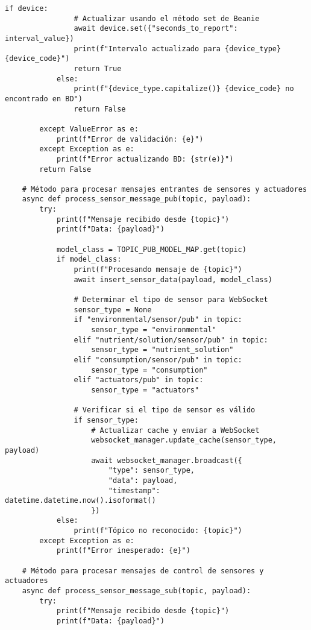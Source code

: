 \begin{lstlisting}[label=cod:mqtt_connection,caption=Definición de Clase para cliente MQTT., language=PythonUTF8]
            if device:
                # Actualizar usando el método set de Beanie
                await device.set({"seconds_to_report": interval_value})       
                print(f"Intervalo actualizado para {device_type} {device_code}")
                return True
            else:
                print(f"{device_type.capitalize()} {device_code} no encontrado en BD")
                return False
                
        except ValueError as e:
            print(f"Error de validación: {e}")
        except Exception as e:
            print(f"Error actualizando BD: {str(e)}")
        return False
            
    # Método para procesar mensajes entrantes de sensores y actuadores
    async def process_sensor_message_pub(topic, payload):
        try:
            print(f"Mensaje recibido desde {topic}")
            print(f"Data: {payload}")

            model_class = TOPIC_PUB_MODEL_MAP.get(topic)
            if model_class:
                print(f"Procesando mensaje de {topic}")
                await insert_sensor_data(payload, model_class)
                
                # Determinar el tipo de sensor para WebSocket
                sensor_type = None
                if "environmental/sensor/pub" in topic:
                    sensor_type = "environmental"
                elif "nutrient/solution/sensor/pub" in topic:
                    sensor_type = "nutrient_solution"
                elif "consumption/sensor/pub" in topic:
                    sensor_type = "consumption"
                elif "actuators/pub" in topic:
                    sensor_type = "actuators"
                
                # Verificar si el tipo de sensor es válido
                if sensor_type:
                    # Actualizar cache y enviar a WebSocket
                    websocket_manager.update_cache(sensor_type, payload)
                    await websocket_manager.broadcast({
                        "type": sensor_type,
                        "data": payload,
                        "timestamp": datetime.datetime.now().isoformat()
                    })
            else:
                print(f"Tópico no reconocido: {topic}")
        except Exception as e:
            print(f"Error inesperado: {e}")

    # Método para procesar mensajes de control de sensores y actuadores
    async def process_sensor_message_sub(topic, payload):
        try:
            print(f"Mensaje recibido desde {topic}")
            print(f"Data: {payload}")


\end{lstlisting}
